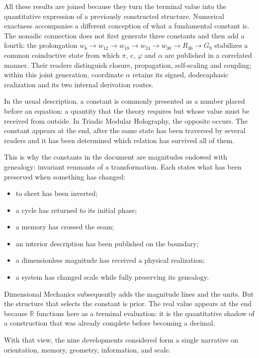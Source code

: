 All these results are joined because they turn the terminal value into the quantitative expression of a previously constructed structure. Numerical exactness accompanies a different conception of what a fundamental constant is. The nonadic connection does not first generate three constants and then add a fourth: the prolongation \(w_6\to w_{12}\to w_{18}\to w_{24}\to w_{30}\to R_{36}\to G_9\) stabilizes a common coinductive state from which \(\pi\), \(e\), \(\varphi\) and \(\alpha\) are published in a correlated manner. Their readers distinguish closure, propagation, self-scaling and coupling; within this joint generation, coordinate \(\alpha\) retains its signed, dodecaphasic realization and its two internal derivation routes.\par

In the usual description, a constant is commonly presented as a number placed before an equation: a quantity that the theory requires but whose value must be received from outside. In Triadic Modular Holography, the opposite occurs. The constant appears at the end, after the same state has been traversed by several readers and it has been determined which relation has survived all of them.\par

This is why the constants in the document are magnitudes endowed with genealogy: invariant remnants of a transformation. Each states what has been preserved when something has changed:\par

\begin{itemize}[leftmargin=*,itemsep=0.35em]
\item to sheet has been inverted;
\item a cycle has returned to its initial phase;
\item a memory has crossed the seam;
\item an interior description has been published on the boundary;
\item a dimensionless magnitude has received a physical realization;
\item a system has changed scale while fully preserving its genealogy.
\end{itemize}

Dimensional Mechanics subsequently adds the magnitude lines and the units. But the structure that selects the constant is prior. The real value appears at the end because \(\mathbb R\) functions here as a terminal evaluation: it is the quantitative shadow of a construction that was already complete before becoming a decimal.\par

With that view, the nine developments considered form a single narrative on orientation, memory, geometry, information, and scale.\par
